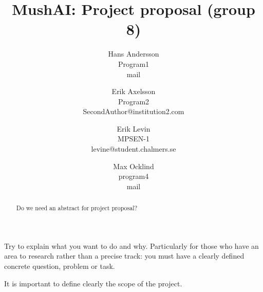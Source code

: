 \documentclass[times, 10pt,twocolumn]{article}
\begin{document}
\title{MushAI: Project proposal (group 8)}

\author{Hans Andersson\\
Program1\\mail\\
\and
Erik Axelsson\\
Program2\\
SecondAuthor@institution2.com\\
\and
Erik Levin\\
MPSEN-1\\
levine@student.chalmers.se
\and
Max Ocklind\\
program4\\
mail
}

\maketitle
\thispagestyle{empty}

\begin{abstract}
Do we need an abstract for project proposal?
\end{abstract}




Try to explain what you want to do and why. Particularly for those who have an area to research rather than a precise track: you must have a clearly defined concrete question, problem or task.





It is important to define clearly the scope of the project.




\end{document}

